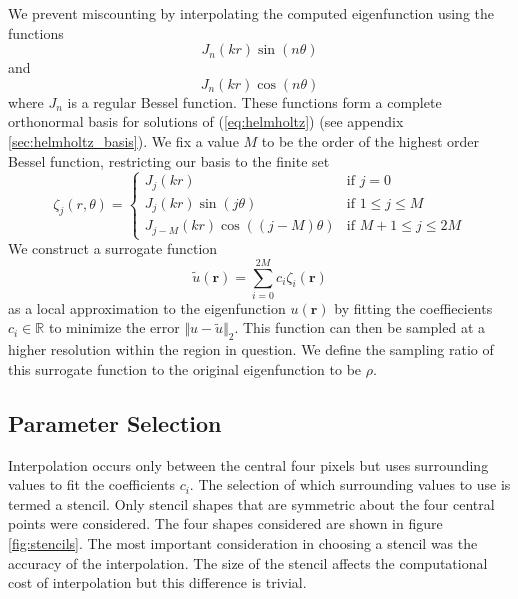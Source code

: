 \documentclass{report}
\newcommand{\rr}[0]{\mathbf{r}}
\begin{document}
We prevent miscounting by interpolating the computed eigenfunction using the functions
\[
J_{n}(k r) \sin(n \theta)
\]
and
\[
J_{n}(k r) \cos(n \theta)
\]
where $J_{n}$ is a regular Bessel function. These functions form a complete orthonormal basis for solutions of (\ref{eq:helmholtz}) (see appendix \ref{sec:helmholtz_basis}). We fix a value $M$ to be the order of the highest order Bessel function, restricting our basis to the finite set
\begin{equation}
  \label{eq:interp_functions}
  \zeta_{j}(r, \theta)=\begin{cases}
  J_{j}(k r) & \text{if }j=0\\
  J_{j}(k r)\sin(j\theta) & \text{if }1 \le j \le M\\
  J_{j-M}(k r)\cos((j-M)\theta) & \text{if }M+1 \le j \le 2M
  \end{cases}
\end{equation}
We construct a surrogate function
\[
  \tilde{u}(\rr) = \sum_{i=0}^{2M} c_{i} \zeta_{i}(\rr)
\]
as a local approximation to the eigenfunction $u(\rr)$ by fitting the coeffiecients $c_{i} \in \mathbb{R}$ to minimize the error $\Vert u - \tilde{u} \Vert_{2}$. This function can then be sampled at a higher resolution within the region in question. We define the sampling ratio of this surrogate function to the original eigenfunction to be $\rho$.

\subsection{Parameter Selection}
\label{sec:params}
Interpolation occurs only between the central four pixels but uses surrounding values to fit the coefficients $c_i$. The selection of which surrounding values to use is termed a stencil. Only stencil shapes that are symmetric about the four central points were considered. The four shapes considered are shown in figure \ref{fig:stencils}. The most important consideration in choosing a stencil was the accuracy of the interpolation. The size of the stencil affects the computational cost of interpolation but this difference is trivial.
\end{document}
